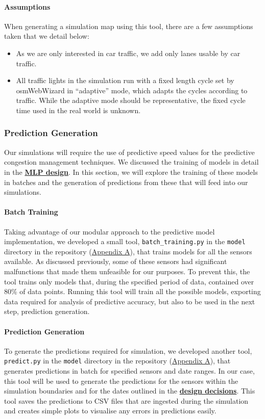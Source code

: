 \paragraph{Assumptions}
When generating a simulation map using this tool, there are a few assumptions taken that we detail below:
\begin{itemize}
    \item As we are only interested in car traffic, we add only lanes usable by car traffic.
    \item All traffic lights in the simulation run with a fixed length cycle set by osmWebWizard in “adaptive” mode, which adapts the cycles according to traffic. While the adaptive mode should be representative, the fixed cycle time used in the real world is unknown.
\end{itemize}

\subsubsection{Prediction Generation}
Our simulations will require the use of predictive speed values for the predictive congestion management techniques. We discussed the training of models in detail in the \textbf{\hyperref[link:mlp-design]{MLP design}}. In this section, we will explore the training of these models in batches and the generation of predictions from these that will feed into our simulations.

\paragraph{Batch Training}
Taking advantage of our modular approach to the predictive model implementation, we developed a small tool, \verb|batch_training.py| in the \verb|model| directory in the repository (\hyperref[appdx:a]{Appendix A}), that trains models for all the sensors available. As discussed previously, some of these sensors had significant malfunctions that made them unfeasible for our purposes. To prevent this, the tool trains only models that, during the specified period of data, contained over 80\% of data points. Running this tool will train all the possible models, exporting data required for analysis of predictive accuracy, but also to be used in the next step, prediction generation.

\paragraph{Prediction Generation}
To generate the predictions required for simulation, we developed another tool, \verb|predict.py| in the \verb|model| directory in the repository (\hyperref[appdx:a]{Appendix A}), that generates predictions in batch for specified sensors and date ranges. In our case, this tool will be used to generate the predictions for the sensors within the simulation boundaries and for the dates outlined in the \textbf{\hyperref[link:sim-design-decisions]{design decisions}}. This tool saves the predictions to CSV files that are ingested during the simulation and creates simple plots to visualise any errors in predictions easily.

